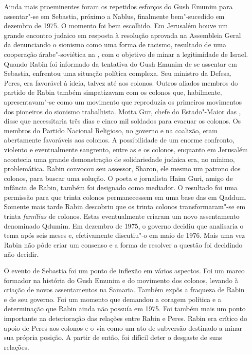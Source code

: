 Ainda mais proeminentes foram os repetidos esforços do Gush Emunim para
assentar"-se em Sebastia, próximo a Nablus, finalmente bem"-sucedido em
dezembro de 1975. O momento foi bem escolhido. Em Jerusalém houve um
grande encontro judaico em resposta à resolução aprovada na Assembleia
Geral da  denunciando o sionismo como uma forma de racismo, resultado
de uma cooperação árabe"-soviética na , com o objetivo de minar a
legitimidade de Israel. Quando Rabin foi informado da tentativa do Gush
Emunim de se assentar em Sebastia, enfrentou uma situação política
complexa. Seu ministro da Defesa, Peres, era favorável à ideia, talvez
até aos colonos. Outros aliados membros do partido de Rabin também
simpatizavam com os colonos que, habilmente, apresentavam"-se como um
movimento que reproduzia os primeiros movimentos dos pioneiros do
sionismo trabalhista. Motta Gur, chefe do Estado"-Maior das , disse
que necessitaria três dias e cinco mil soldados para evacuar os colonos.
Os membros do Partido Nacional Religioso, no governo e na coalizão, eram
abertamente favoráveis aos colonos. A possibilidade de um enorme
confronto, violento e eventualmente sangrento, entre as  e os
colonos, enquanto em Jerusalém acontecia uma grande demonstração de
solidariedade judaica era, no mínimo, problemática. Rabin convocou seu
assessor, Sharon, ele mesmo um patrono dos colonos, para buscar uma
solução. O poeta e jornalista Haim Guri, amigo de infância de Rabin,
também foi designado como mediador. O resultado foi uma
permissão para que trinta colonos permanecessem em uma base das  em
Qaddum. Somente mais tarde Rabin descobriu que os trinta colonos
transformaram"-se em trinta \emph{famílias} de colonos. Estas
eventualmente criaram um novo assentamento denominado Qdumim. Em
dezembro de 1975, o governo decidiu que analisaria o tema após seis meses
e, efetivamente discutiu"-o em maio de 1976. Mais uma vez Rabin não pôde
criar um consenso e a forma de resolver a questão foi decidindo não
decidir.

O evento de Sebastia foi um ponto de inflexão em vários aspectos. Foi um
marco formador na história do Gush Emunim e do movimento dos colonos,
levando à criação de novos assentamentos na Samaria. Também expôs a
fraqueza de Rabin e de seu governo. Foi um momento que demandou a
coragem política e a determinação que Rabin ainda não possuía em 1975.
Foi também mais um ponto importante na deterioração das relações entre
Rabin e Peres. Rabin era crítico do apoio de Peres aos colonos e o via
como um ato de subversão destinado a minar sua própria posição. A partir
de então, foi difícil deter o desgaste de suas relações.

